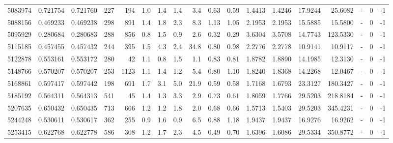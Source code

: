 \begin{tabular}{rrrrrrrrrrrrrrrlrr}
   5083974 & 0.721754 &   0.721760 &  227 &  194 &      1.0 &      1.4 &     1.4 &      3.4 &       0.63 &        0.59 &  1.4413 &  1.4246 &   17.9244 &   25.6082 &             - &        0 &         -1 \\
   5088156 & 0.469233 &   0.469238 &  298 &  891 &      1.4 &      1.8 &     2.3 &      8.3 &       1.13 &        1.05 &  2.1953 &  2.1953 &   15.5885 &   15.5800 &             - &        0 &         -1 \\
   5095929 & 0.280684 &   0.280683 &  288 &  856 &      0.8 &      1.5 &     0.9 &      2.6 &       0.32 &        0.29 &  3.6304 &  3.5708 &   14.7743 &  123.5330 &             - &        0 &         -1 \\
   5115185 & 0.457455 &   0.457432 &  244 &  395 &      1.5 &      4.3 &     2.4 &     34.8 &       0.80 &        0.98 &  2.2776 &  2.2778 &   10.9141 &   10.9117 &             - &        0 &         -1 \\
   5122878 & 0.553161 &   0.553172 &  280 &   42 &      1.1 &      0.8 &     1.5 &      1.1 &       0.83 &        0.81 &  1.8782 &  1.8890 &   14.1985 &   12.3130 &             - &        0 &         -1 \\
   5148766 & 0.570207 &   0.570207 &  253 & 1123 &      1.1 &      1.4 &     1.2 &      5.4 &       0.80 &        1.10 &  1.8240 &  1.8368 &   14.2268 &   12.0467 &             - &        0 &         -1 \\
   5168861 & 0.597417 &   0.597442 &  198 &  691 &      1.7 &      3.1 &     5.0 &     21.9 &       0.59 &        0.58 &  1.7168 &  1.6793 &   23.3127 &  180.3427 &             - &        0 &         -1 \\
   5185192 & 0.564311 &   0.564313 &  541 &   45 &      1.4 &      1.3 &     3.3 &      2.9 &       0.73 &        0.61 &  1.8059 &  1.7766 &   29.5203 &  218.8184 &             - &        0 &         -1 \\
   5207635 & 0.650432 &   0.650435 &  713 &  666 &      1.2 &      1.2 &     1.8 &      2.0 &       0.68 &        0.66 &  1.5713 &  1.5403 &   29.5203 &  345.4231 &             - &        0 &         -1 \\
   5244248 & 0.530611 &   0.530617 &  362 &  255 &      0.9 &      1.6 &     0.9 &      6.5 &       0.88 &        1.18 &  1.9437 &  1.9437 &   16.9276 &   16.9262 &             - &        0 &         -1 \\
   5253415 & 0.622768 &   0.622778 &  586 &  308 &      1.2 &      1.7 &     2.3 &      4.5 &       0.49 &        0.70 &  1.6396 &  1.6086 &   29.5334 &  350.8772 &             - &        0 &         -1 \\

\end{tabular}
